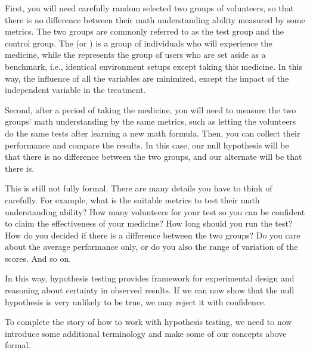 \documentclass[letterpaper,11pt,english]{sphinxmanual}
\begin{document}
First, you will need carefully random selected two groups of volunteers,
so that there is no difference between their math understanding ability
measured by some metrics. The two groups are commonly referred to as the
test group and the control group. The  (or ) is a group of individuals who will experience the medicine,
while the  represents the group of users who are set
aside as a benchmark, i.e., identical environment setups except taking
this medicine. In this way, the influence of all the variables are
minimized, except the impact of the independent variable in the
treatment.

Second, after a period of taking the medicine, you will need to measure
the two groups’ math understanding by the same metrics, such as letting
the volunteers do the same tests after learning a new math formula.
Then, you can collect their performance and compare the results. In this
case, our null hypothesis will be that there is no difference between
the two groups, and our alternate will be that there is.

This is still not fully formal. There are many details you have to think
of carefully. For example, what is the suitable metrics to test their
math understanding ability? How many volunteers for your test so you can
be confident to claim the effectiveness of your medicine? How long
should you run the test? How do you decided if there is a difference
between the two groups? Do you care about the average performance only,
or do you also the range of variation of the scores. And so on.

In this way, hypothesis testing provides framework for experimental
design and reasoning about certainty in observed results. If we can now
show that the null hypothesis is very unlikely to be true, we may reject
it with confidence.

To complete the story of how to work with hypothesis testing, we need to
now introduce some additional terminology and make some of our concepts
above formal.
\end{document}
